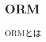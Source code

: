 \documentclass[../../../main]{subfiles}
\begin{document}
    \subsection{ORM}\label{subsec:phraseology-orm}

    ORMとは
\end{document}
